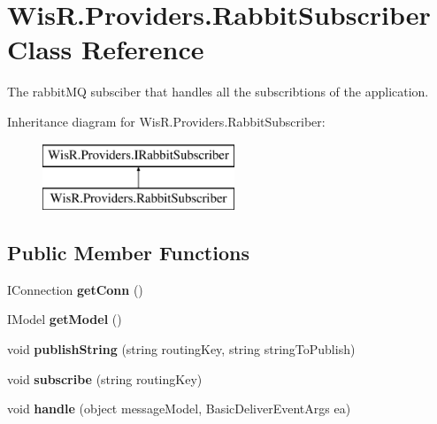 \hypertarget{class_wis_r_1_1_providers_1_1_rabbit_subscriber}{}\section{Wis\+R.\+Providers.\+Rabbit\+Subscriber Class Reference}
\label{class_wis_r_1_1_providers_1_1_rabbit_subscriber}


The rabbit\+M\+Q subsciber that handles all the subscribtions of the application.  


Inheritance diagram for Wis\+R.\+Providers.\+Rabbit\+Subscriber\+:\begin{figure}[H]
\begin{center}
\leavevmode
\includegraphics[height=2.000000cm]{class_wis_r_1_1_providers_1_1_rabbit_subscriber}
\end{center}
\end{figure}
\subsection*{Public Member Functions}
\begin{DoxyCompactItemize}
\item 
\hypertarget{class_wis_r_1_1_providers_1_1_rabbit_subscriber_a3d62063d86143b3107a55df8ff08bd5b}{}I\+Connection {\bfseries get\+Conn} ()\label{class_wis_r_1_1_providers_1_1_rabbit_subscriber_a3d62063d86143b3107a55df8ff08bd5b}

\item 
\hypertarget{class_wis_r_1_1_providers_1_1_rabbit_subscriber_ac66e443a4e2e38b93b75ce16199601cf}{}I\+Model {\bfseries get\+Model} ()\label{class_wis_r_1_1_providers_1_1_rabbit_subscriber_ac66e443a4e2e38b93b75ce16199601cf}

\item 
\hypertarget{class_wis_r_1_1_providers_1_1_rabbit_subscriber_ad319a3dea0af56c0ac2c750ce8332c04}{}void {\bfseries publish\+String} (string routing\+Key, string string\+To\+Publish)\label{class_wis_r_1_1_providers_1_1_rabbit_subscriber_ad319a3dea0af56c0ac2c750ce8332c04}

\item 
\hypertarget{class_wis_r_1_1_providers_1_1_rabbit_subscriber_abb6d7911d03e3530c5e48c067ffb9241}{}void {\bfseries subscribe} (string routing\+Key)\label{class_wis_r_1_1_providers_1_1_rabbit_subscriber_abb6d7911d03e3530c5e48c067ffb9241}

\item 
\hypertarget{class_wis_r_1_1_providers_1_1_rabbit_subscriber_aed627724abeee98ab3c06178c48e574e}{}void {\bfseries handle} (object message\+Model, Basic\+Deliver\+Event\+Args ea)\label{class_wis_r_1_1_providers_1_1_rabbit_subscriber_aed627724abeee98ab3c06178c48e574e}

\end{DoxyCompactItemize}


